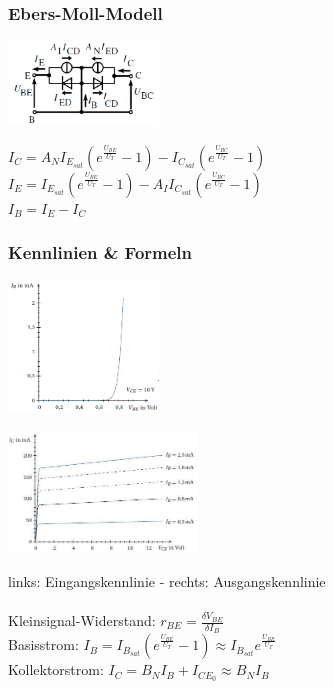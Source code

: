 	\subsubsection{Ebers-Moll-Modell}
		\begin{minipage}[c]{4cm}
			\includegraphics[width=4cm]{images/bipolar-EbersMoll}
		\end{minipage}
		\begin{minipage}[c]{8cm}
			$I_C=A_NI_{E_{sat}}(e^{\frac{U_{BE}}{U_T}}-1)
			 -I_{C_{sat}}(e^{\frac{U_{BC}}{U_T}}-1)$ \\
			$I_E=I_{E_{sat}}(e^{\frac{U_{BE}}{U_T}}-1)
			 -A_II_{C_{sat}}(e^{\frac{U_{BC}}{U_T}}-1)$ \\
			$I_B=I_E-I_C$ \\
		\end{minipage}
	
	\subsubsection{Kennlinien \& Formeln}
		\begin{minipage}[c]{4cm}
			\includegraphics[width=4cm]{images/bipolarEingangsKennlinie}
		\end{minipage}
		\begin{minipage}[c]{5cm}
			\includegraphics[width=5cm]{images/bipolarAusgangsKennlinie}\\
		\end{minipage}
		\begin{minipage}[c]{8cm}
			links: Eingangskennlinie - rechts: Ausgangskennlinie \\
			\\
			Kleinsignal-Widerstand: $r_{BE} = \frac{\delta V_{BE}}{\delta I_B} $ \\
			Basisstrom: $I_B=I_{B_{sat}}(e^{\frac{U_{BE}}{U_T}}-1)
						\approx I_{B_{sat}} e^{\frac{U_{BE}}{U_T}}$ \\
			Kollektorstrom: $I_C = B_N I_B+I_{CE_{0}} \approx B_N I_B$ \\
			
		\end{minipage}
	
